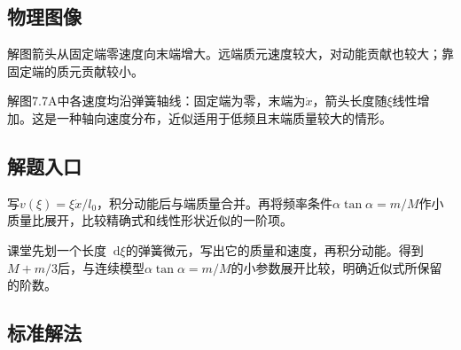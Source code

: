 \documentclass[UTF8,fontset=fandol,a4paper,11pt]{ctexart}
\newcommand{\dd}{\mathop{}\!\mathrm{d}}
\begin{document}

\subsection*{物理图像}

解图箭头从固定端零速度向末端增大。远端质元速度较大，对动能贡献也较大；靠固定端的质元贡献较小。

解图7.7A中各速度均沿弹簧轴线：固定端为零，末端为$\dot x$，箭头长度随$\xi$线性增加。这是一种轴向速度分布，近似适用于低频且末端质量较大的情形。




\subsection*{解题入口}

写\(v(\xi)=\xi\dot x/l_0\)，积分动能后与端质量合并。再将频率条件\(\alpha\tan\alpha=m/M\)作小质量比展开，比较精确式和线性形状近似的一阶项。

课堂先划一个长度$\dd\xi$的弹簧微元，写出它的质量和速度，再积分动能。得到$M+m/3$后，与连续模型$\alpha\tan\alpha=m/M$的小参数展开比较，明确近似式所保留的阶数。





\subsection*{标准解法}
\end{document}
